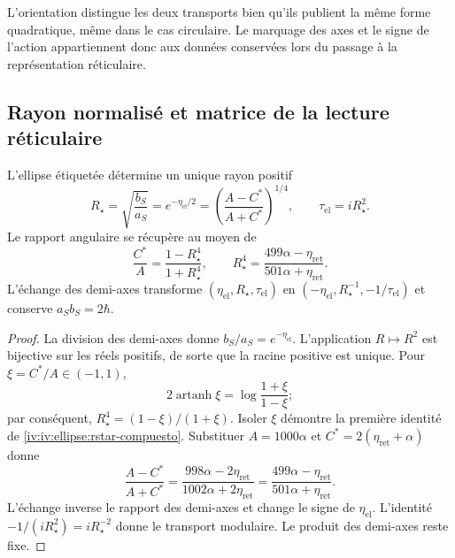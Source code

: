 L’orientation distingue les deux transports bien qu’ils publient
la même forme quadratique, même dans le cas circulaire.
Le marquage des axes et le signe de l’action appartiennent
donc aux données conservées lors du passage à la
représentation réticulaire.

\subsection{Rayon normalisé et matrice de la lecture réticulaire}
\label{iv:iv:ellipse:radio}

\begin{proposition}
\label{iv:iv:ellipse:radio-prop}
L’ellipse étiquetée détermine un unique rayon positif
\begin{equation}
 R_\star=\sqrt{\frac{b_S}{a_S}}
 =e^{-\eta_{\mathrm{el}}/2}
 =\left(\frac{A-C^*}{A+C^*}\right)^{1/4},
 \qquad \tau_{\mathrm{el}}=iR_\star^2.
 \label{iv:iv:ellipse:rstar}
\end{equation}
Le rapport angulaire se récupère au moyen de
\begin{equation}
 \frac{C^*}{A}=\frac{1-R_\star^4}{1+R_\star^4},
 \qquad
 R_\star^4=
 \frac{499\alpha-\eta_{\mathrm{ret}}}
      {501\alpha+\eta_{\mathrm{ret}}}.
 \label{iv:iv:ellipse:rstar-compuesto}
\end{equation}
L’échange des demi-axes transforme
\((\eta_{\mathrm{el}},R_\star,\tau_{\mathrm{el}})\) en
\((-\eta_{\mathrm{el}},R_\star^{-1},-1/\tau_{\mathrm{el}})\)
et conserve \(a_Sb_S=2\hbar\).
\end{proposition}
\begin{proof}
La division des demi-axes donne \(b_S/a_S=e^{-\eta_{\mathrm{el}}}\).
L’application \(R\mapsto R^2\) est bijective sur les réels
positifs, de sorte que la racine positive est unique.
Pour \(\xi=C^*/A\in(-1,1)\),
\[
 2\operatorname{artanh}\xi
 =\log\frac{1+\xi}{1-\xi};
\]
par conséquent, \(R_\star^4=(1-\xi)/(1+\xi)\).
Isoler \(\xi\) démontre la première identité de
\eqref{iv:iv:ellipse:rstar-compuesto}. Substituer
\(A=1000\alpha\) et
\(C^*=2(\eta_{\mathrm{ret}}+\alpha)\) donne
\[
 \frac{A-C^*}{A+C^*}
 =\frac{998\alpha-2\eta_{\mathrm{ret}}}
        {1002\alpha+2\eta_{\mathrm{ret}}}
 =\frac{499\alpha-\eta_{\mathrm{ret}}}
        {501\alpha+\eta_{\mathrm{ret}}}.
\]
L’échange inverse le rapport des demi-axes et change le
signe de \(\eta_{\mathrm{el}}\). L’identité
\(-1/(iR_\star^2)=iR_\star^{-2}\) donne le transport
modulaire. Le produit des demi-axes reste fixe.
\end{proof}

